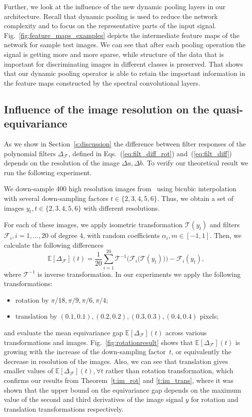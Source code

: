 \documentclass[10pt,journal,compsoc]{IEEEtran}
\newcommand{\mF}{\mathcal{F}}
\begin{document}
	Further, we look at the influence of the new dynamic pooling layers in our architecture. Recall that dynamic pooling is used to reduce the network complexity and to focus on the representative parts of the input signal. Fig.~\ref{fig:feature_maps_examples} depicts the intermediate feature maps of the network for sample test images. We can see that after each pooling operation the signal is getting more and more sparse, while structure of the data that is important for discriminating images in different classes is preserved. That shows that our dynamic pooling operator is able to retain the important information in the feature maps constructed by the spectral convolutional layers.

	\subsection{Influence of the image resolution on the quasi-equivariance}

	As we show in Section~\ref{s:discussion} the difference between filter responses of the polynomial filters $\Delta_\mathcal{F}$, defined in Eqs.~(\ref{eq:filt_diff_rot}) and~(\ref{eq:filt_diff}) depends on the resolution of the image $\Delta a, \Delta b$. To verify our theoretical result we run the following experiment.

	We down-sample $400$ high resolution images from~\cite{bb:Agustsson_2017_CVPR_Workshops} using bicubic interpolation with several down-sampling factors $t\in\{2,3,4,5,6\}$. Thus, we obtain a set of images $y_t, t\in\{2,3,4,5,6\}$ with different resolutions.

	For each of these images,  we apply isometric transformation $\mathcal{T}(y_t)$ and filters $\mF_i, i =1,...,20$ of degree $4$, with random coefficients $\alpha_i,m \in [-1, 1]$. Then, we calculate the following differences
		\begin{equation}
		\mathbb{E}[\Delta_{\mF}](t) = \frac{1}{20} \sum_{i=1}^{20} \mathcal{T}^{-1}\big(\mF_i\big(\mathcal{T}(y_t)\big)\big) - \mF_i(y_t),
		\label{eq:dist}
		\end{equation}
	where $\mathcal{T}^{-1}$ is inverse transformation. In our experiments we apply the following transformations:
	\begin{itemize}
	\item rotation by $\pi/18, \pi/9, \pi/6, \pi/4$;
	\item translation by $(0.1, 0.1),(0.2, 0.2),(0.3, 0.3),(0.4, 0.4)$ pixels;
	\end{itemize}
	and evaluate the mean equivariance gap $\mathbb{E}[\Delta_{\mF}](t)$ across various transformations and images. Fig.~\ref{fig:rotationresult} shows that $\mathbb{E}[\Delta_{\mF}](t)$ is growing with the increase of the  down-sampling factor~$t$, or equivalently the decrease in resolution of the images.  Also, we can see that translation gives smaller values of  $\mathbb{E}[\Delta_{\mF}](t), \forall t$ rather than rotation transformation, which confirms our results from Theorem~\ref{t:im_rot} and \ref{t:im_trans}, where it was shown that the upper bound on the equivariance gap depends on the maximum value of the second and third derivatives of the image signal $y$ for rotation and translation transformations respectively.
\end{document}
